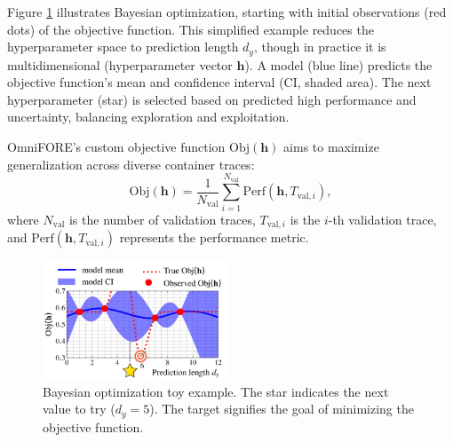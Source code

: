 Figure \ref{fig:gp_toy_example} illustrates Bayesian optimization, starting with initial observations (red dots) of the objective function. This simplified example reduces the hyperparameter space to prediction length $d_y$, though in practice it is multidimensional (hyperparameter vector $\mathbf{h}$). A model (blue line) predicts the objective function's mean and confidence interval (CI, shaded area). The next hyperparameter (star) is selected based on predicted high performance and uncertainty, balancing exploration and exploitation.

OmniFORE's custom objective function $\text{Obj}(\mathbf{h})$ aims to maximize generalization across diverse container traces:
\begin{equation}
    \text{Obj}(\mathbf{h}) = \frac{1}{N_{\text{val}}} \sum_{i=1}^{N_{\text{val}}} \text{Perf}(\mathbf{h}, T_{\text{val}, i}),
\end{equation}
where $N_{\text{val}}$ is the number of validation traces, $T_{\text{val}, i}$ is the $i$-th validation trace, and $\text{Perf}(\mathbf{h}, T_{\text{val}, i})$ represents the performance metric.

\begin{figure}
\centering
\includegraphics[width=0.49\textwidth]{img/gp_toy_example.pdf}
\caption{Bayesian optimization toy example. The star indicates the next value to try ($d_y = 5$). The target signifies the goal of minimizing the objective function.}
\label{fig:gp_toy_example}
\end{figure}
